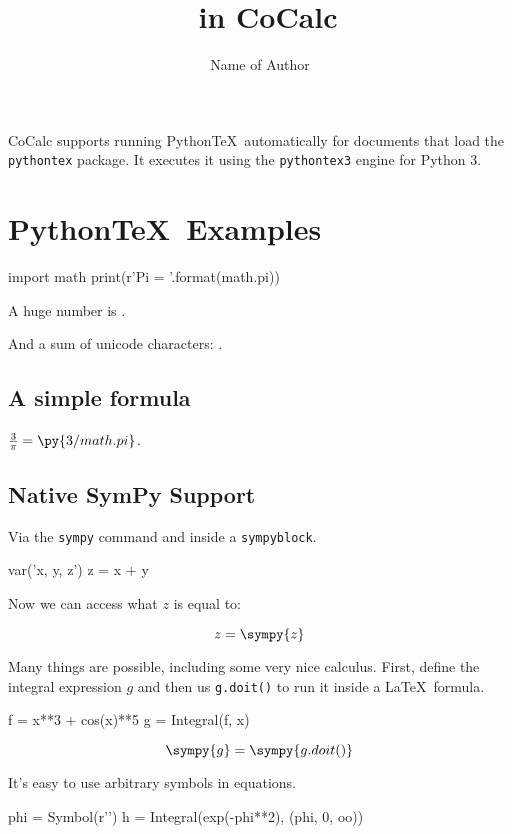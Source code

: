 \documentclass{scrartcl}
\title{\pytex\ in CoCalc}
\author{Name of Author}
\newcommand{\pytex}{Python\TeX}
\begin{document}
\maketitle

CoCalc supports running \pytex\ automatically for documents that load the \verb|pythontex| package.
It executes it using the \verb|pythontex3| engine for Python 3.

\section{\pytex\ Examples}

\begin{pycode}
import math
print(r'Pi = {}'.format(math.pi))
\end{pycode}

A huge number is .

And a sum of unicode characters: .

\subsection{A simple formula}

$\frac{3}{\pi} = \py{3 / math.pi}$.

\subsection{Native SymPy Support}

Via the \verb|sympy|  command and inside a \verb|sympyblock|.

\begin{sympyblock}
var('x, y, z')
z = x + y
\end{sympyblock}

Now we can access what $z$ is equal to:

\[z=\sympy{z}\]

Many things are possible, including some very nice calculus.
First, define the integral expression $g$ and then us \verb|g.doit()| to run it inside a \LaTeX\ formula.

\begin{sympyblock}
f = x**3 + cos(x)**5
g = Integral(f, x)
\end{sympyblock}

\[\sympy{g}=\sympy{g.doit()}\]

It's easy to use arbitrary symbols in equations.

\begin{sympyblock}
phi = Symbol(r'\phi')
h = Integral(exp(-phi**2), (phi, 0, oo))
\end{sympyblock}
\end{document}
